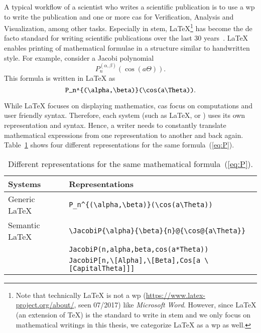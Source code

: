A typical workflow of a scientist who writes a scientific publication is to use a \gls*{wp} to write the publication and one or more \gls*{cas} for Verification, Analysis and Visualization, among other tasks. Especially in \gls*{stem}, \LaTeX\footnote{Note that technically \LaTeX{} is not a \gls*{wp} (\url{https://www.latex-project.org/about/}, seen 07/2017) like \textit{Microsoft Word}. However, since \LaTeX{} (an extension of \TeX) is the standard to write in \gls*{stem} and we only focus on mathematical writings in this thesis, we categorize \LaTeX{} as a \gls*{wp} as well.} has become the de facto standard for writing scientific publications over the last 30 years~\cites{LATEX:Standard}[559]{DigitalTypo}{Knuth}. \LaTeX{} enables printing of mathematical formulae in a structure similar to handwritten style. For example, consider a Jacobi polynomial~\cite[(18.3), table 1]{NIST:DLMF}
\begin{equation}\label{eq:P}
P_n^{(\alpha , \beta)}(\cos(a\Theta)).
\end{equation}
This formula is written in \LaTeX{} as
\begin{equation}\label{eq:P-tex}
\verb|P_n^{(\alpha,\beta)}(\cos(a\Theta))|.
\end{equation}

While \LaTeX{} focuses on displaying mathematics, \gls*{cas} focus on computations and user friendly syntax. Therefore, each system (such as \LaTeX{}, \Maple{} or \Mathematica) uses its own representation and syntax. Hence, a writer needs to constantly translate mathematical expressions from one representation to another and back again. Table~\ref{tab:JacobiP-usecase} shows four different representations for the same formula~(\ref{eq:P}).

\begin{table}[ht]
	\centering
	\begin{tabular}{ll}
		\hline
		Systems & Representations \\
		\hline
		\hline
		Generic \LaTeX\ & \verb|P_n^{(\alpha,\beta)}(\cos(a\Theta))| \\ 
		Semantic \LaTeX\ & \verb|\JacobiP{\alpha}{\beta}{n}@{\cos@{a\Theta}}| \\
		\Maple & \verb|JacobiP(n,alpha,beta,cos(a*Theta))| \\ 
		\Mathematica & \verb|JacobiP[n,\[Alpha],\[Beta],Cos[a \[CapitalTheta]]]|\\
		\hline
	\end{tabular}
	\caption{Different representations for the same mathematical formula~(\ref{eq:P}).}
	\label{tab:JacobiP-usecase}
\end{table}

